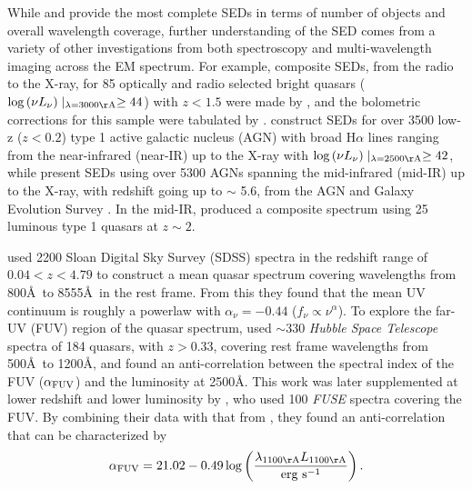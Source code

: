 While \citet{Elvis:1994} and \citet{Richards:2006} provide the most complete SEDs in terms of number of objects and overall wavelength coverage, further understanding of the SED comes from a variety of other investigations from both spectroscopy and multi-wavelength imaging across the EM spectrum.  
For example, composite SEDs, from the radio to the X-ray, for 85 optically and radio selected bright quasars ($\log{(\nu L_{\nu})}\mid_{\lambda=3000 {\rm \AA}} \geq 44$) with $z<1.5$ were made by \citet{Shang:2011}, and the bolometric corrections for this sample were tabulated by \citet{Runnoe:2012}.  
\citet{Stern:2012} construct SEDs for over 3500 low-z ($z<0.2$) type 1 active galactic nucleus (AGN) with broad H$\alpha$ lines ranging from the near-infrared (near-IR) up to the X-ray with $\log{(\nu L_{\nu})}\mid_{\lambda=2500 {\rm \AA}} \geq 42$, while \citet{Assef:2010} present SEDs using over 5300 AGNs spanning the mid-infrared (mid-IR) up to the X-ray, with redshift going up to $\sim$ 5.6, from the AGN and Galaxy Evolution Survey \citep[AGES; ][]{Kochanek:2012}.
In the mid-IR, \citet{Deo:2011} produced a composite spectrum using 25 luminous type 1 quasars at $z \sim 2$.

\citet{Vanden-Berk:2001} used 2200 Sloan Digital Sky Survey (SDSS) spectra in the redshift range of $0.04<z<4.79$ to construct a mean quasar spectrum covering wavelengths from 800\AA\ to 8555\AA\ in the rest frame.  From this they found that the mean UV continuum is roughly a powerlaw with $\alpha_{\nu}=-0.44$ ($f_{\nu}\propto\nu^{\alpha}$).    
To explore the far-UV (FUV) region of the quasar spectrum, \citet{Telfer:2002} used $\sim 330$ {\em Hubble Space Telescope} spectra of 184 quasars, with $z>0.33$, covering rest frame wavelengths from 500\AA\ to 1200\AA, and found an anti-correlation between the spectral index of the FUV ($\alpha_{{\rm FUV}}$) and the luminosity at 2500\AA.  This work was later supplemented at lower redshift and lower luminosity by \citet{Scott:2004}, who used 100 {\em FUSE} spectra covering the FUV.  By combining their data with that from \citet{Telfer:2002}, they found an anti-correlation that can be characterized by
\begin{equation}
 \alpha_{{\rm FUV}} = 21.02-0.49 \log \left( \frac{\lambda_{1100{\rm \AA}} L_{1100{\rm \AA}}}{\mbox{erg s}^{-1}}\right).
 \label{scott_eq}
\end{equation}

